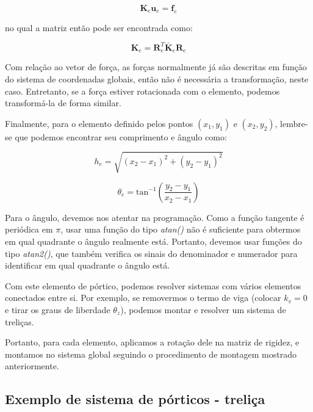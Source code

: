         \begin{equation*}
            \mathbf{K}_e \mathbf{u}_e = \mathbf{f}_e
        \end{equation*}

        \noindent no qual a matriz então pode ser encontrada como:

        \begin{equation*}
            \mathbf{K}_e = \mathbf{R}_e^T \mathbf{\bar{K}}_e \mathbf{R}_e
        \end{equation*}

        Com relação ao vetor de força, as forças normalmente já são descritas em função do sistema de coordenadas globais, então não é necessária a transformação, neste caso. Entretanto, se a força estiver rotacionada com o elemento, podemos transformá-la de forma similar.

        Finalmente, para o elemento definido pelos pontos $(x_1,y_1)$ e $(x_2,y_2)$, lembre-se que podemos encontrar seu comprimento e ângulo como:

        \begin{equation*}
            h_e = \sqrt{\left(x_2-x_1\right)^2+\left(y_2-y_1\right)^2}
        \end{equation*}

        \begin{equation*}
            \theta_e = \text{tan}^{-1}\left(\frac{y_2-y_1}{x_2-x_1}\right)
        \end{equation*}

        Para o ângulo, devemos nos atentar na programação. Como a função tangente é periódica em $\pi$, usar uma função do tipo \textit{atan()} não é suficiente para obtermos em qual quadrante o ângulo realmente está. Portanto, devemos usar funções do tipo \textit{atan2()}, que também verifica os sinais do denominador e numerador para identificar em qual quadrante o ângulo está.


        Com este elemento de pórtico, podemos resolver sistemas com vários elementos conectados entre si. Por exemplo, se removermos o termo de viga (colocar $k_v=0$ e tirar os graus de liberdade $\theta_z$), podemos montar e resolver um sistema de treliças.

        Portanto, para cada elemento, aplicamos a rotação dele na matriz de rigidez, e montamos no sistema global seguindo o procedimento de montagem mostrado anteriormente.

    \subsection{Exemplo de sistema de pórticos - treliça}

